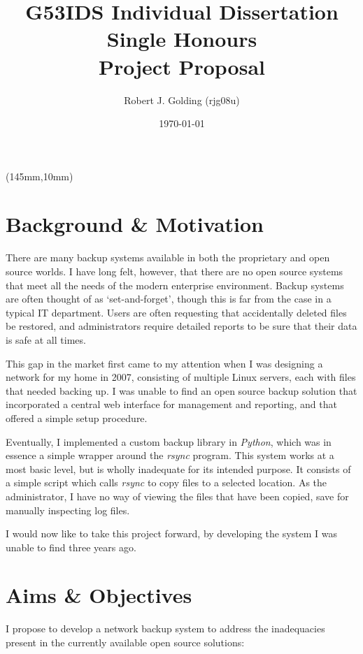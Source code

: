 \documentclass[a4paper]{article}
\title{
    \vspace{3cm}
    \huge{G53IDS Individual Dissertation Single Honours} \\[0.5cm]
    \LARGE{Project Proposal} \\[0.2cm]
}
\author{Robert J. Golding (rjg08u)} \date{\today}
\begin{document}
    \begin{textblock*}{60mm}(145mm,10mm)
        
    \end{textblock*}
    \maketitle
    \thispagestyle{empty}
    \newpage

    \section{Background \& Motivation}

    There are many backup systems available in both the proprietary and open
    source worlds. I have long felt, however, that there are no open source
    systems that meet all the needs of the modern enterprise environment.
    Backup systems are often thought of as `set-and-forget', though this is far
    from the case in a typical IT department. Users are often requesting that
    accidentally deleted files be restored, and administrators require detailed
    reports to be sure that their data is safe at all times.

    This gap in the market first came to my attention when I was designing
    a network for my home in 2007, consisting of multiple Linux servers, each
    with files that needed backing up. I was unable to find an open source
    backup solution that incorporated a central web interface for management
    and reporting, and that offered a simple setup procedure.

    Eventually, I implemented a custom backup library in \emph{Python}, which
    was in essence a simple wrapper around the \emph{rsync} program. This
    system works at a most basic level, but is wholly inadequate for its
    intended purpose. It consists of a simple script which calls \emph{rsync}
    to copy files to a selected location. As the administrator, I have no way
    of viewing the files that have been copied, save for manually inspecting
    log files.

    I would now like to take this project forward, by developing the system
    I was unable to find three years ago.

    \section{Aims \& Objectives}

    I propose to develop a network backup system to address the inadequacies
    present in the currently available open source solutions:
\end{document}
